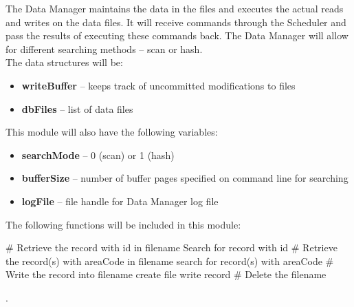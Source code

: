 The Data Manager maintains the data in the files and executes the actual reads and writes on the data files. It will receive commands through the Scheduler and pass the results of executing these commands back. The Data Manager will allow for different searching methods -- scan or hash. \\

The data structures will be:

\begin{itemize}
\item \textbf{writeBuffer} -- keeps track of uncommitted modifications to files
\item \textbf{dbFiles} -- list of data files
\end{itemize}

This module will also have the following variables:
\begin{itemize}
\item \textbf{searchMode} -- 0 (scan) or 1 (hash)
\item \textbf{bufferSize} -- number of buffer pages specified on command line for searching
\item \textbf{logFile} -- file handle for Data Manager log file
\end{itemize}

The following functions will be included in this module:\\

\begin{algorithmic}
	\State  \# Retrieve the record with id in filename
		\EndIf
		\State  Search for record with id
		\EndIf	
	\EndFunction
	\State
	\State \# Retrieve the record(s) with areaCode in filename
		\EndIf
		\State  search for record(s) with areaCode
		\EndIf	
	\EndFunction
	\State
	\State \# Write the record into filename
			create file
		\EndIf
		\State write record
	\EndFunction
	\State
	\State \# Delete the filename
	\EndFunction

\end{algorithmic} .\\